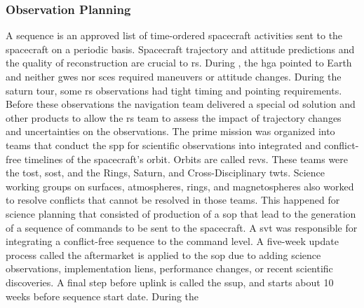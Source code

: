 \documentclass{article}
\begin{document}
            \subsubsection{\footnotesize{Observation Planning}}
                \label{subsubsec:usr_obs_planning}
                A \gls{sequence} is an approved list of
                time-ordered spacecraft activities sent to the
                spacecraft on a periodic basis. Spacecraft
                \gls{trajectory} and \gls{attitude} predictions
                and the quality of reconstruction are crucial to
                \gls{rs}. During ,
                the \gls{hga} pointed to Earth and neither
                \glspl{gwe} nor \glspl{sce} required maneuvers or
                \gls{attitude} changes. During the
                \gls{saturn tour}, some \gls{rs} observations had
                tight timing and pointing requirements. Before
                these observations the navigation team delivered
                a special \gls{od} solution and other products
                to allow the \gls{rs} team to assess the impact
                of trajectory changes and uncertainties on the
                observations. The \gls{prime mission} was
                organized into teams that conduct the \gls{spp}
                for scientific observations into integrated and
                conflict-free timelines of the spacecraft's orbit.
                Orbits are called \glspl{rev}. These teams were
                the \gls{tost}, \gls{sost}, and the Rings, Saturn,
                and Cross-Disciplinary \glspl{twt}. Science
                working groups on surfaces, atmospheres, rings,
                and \glspl{magnetosphere} also worked to resolve
                conflicts that cannot be resolved in those teams.
                This happened for science planning that consisted
                of production of a \gls{sop} that lead to the
                generation of a sequence of commands to be sent
                to the spacecraft. A \gls{svt} was responsible
                for integrating a conflict-free sequence to the
                command level. A five-week update process called
                the aftermarket is applied to the \gls{sop} due
                to adding science observations, implementation
                liens, performance changes, or recent scientific
                discoveries. A final step before \gls{uplink}
                is called the \gls{ssup}, and starts about
                10 weeks before sequence start date. During the
\end{document}

